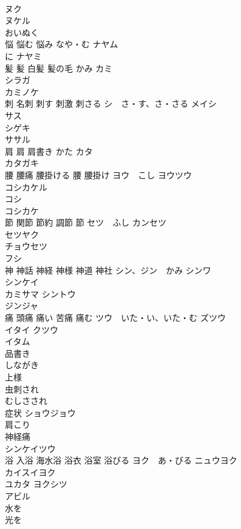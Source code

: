 \documentclass[8pt]{extreport}
\begin{document}
\begin{CJK}{UTF8}{min}
\\	ヌク　
\\	ヌケル 
\\	おいぬく 
\\	悩 悩む 悩み	なや・む ナヤム 
\\	に ナヤミ 
\\	髪 髪 白髪 髪の毛	かみ カミ 
\\	シラガ 
\\	カミノケ 
\\	刺 名刺 刺す 刺激 刺さる	シ　さ・す、さ・さる メイシ 
\\	サス 
\\	シゲキ 
\\	ササル　
\\	肩 肩 肩書き	かた カタ 
\\	カタガキ 
\\	腰 腰痛 腰掛ける 腰 腰掛け	ヨウ　こし ヨウツウ 
\\	コシカケル 
\\	コシ 
\\	コシカケ 
\\	節 関節 節約 調節 節	セツ　ふし カンセツ 
\\	セツヤク　
\\	チョウセツ 
\\	フシ　
\\	神 神話 神経 神様 神道 神社	シン、ジン　かみ シンワ 
\\	シンケイ 
\\	カミサマ シントウ 
\\	ジンジャ 
\\	痛 頭痛 痛い 苦痛 痛む	ツウ　いた・い、いた・む ズツウ 
\\	イタイ クツウ 
\\	イタム 
\\	品書き	
\\	しながき
\\	上様	
\\	虫刺され	
\\	むしさされ
\\	症状	ショウジョウ 
\\	肩こり	
\\	神経痛	
\\	シンケイツウ
\\	浴 入浴 海水浴 浴衣 浴室 浴びる	ヨク　あ・びる ニュウヨク 
\\	カイスイヨク 
\\	ユカタ ヨクシツ　
\\	アビル 
\\	水を 
\\	光を

\end{CJK}
\end{document}
